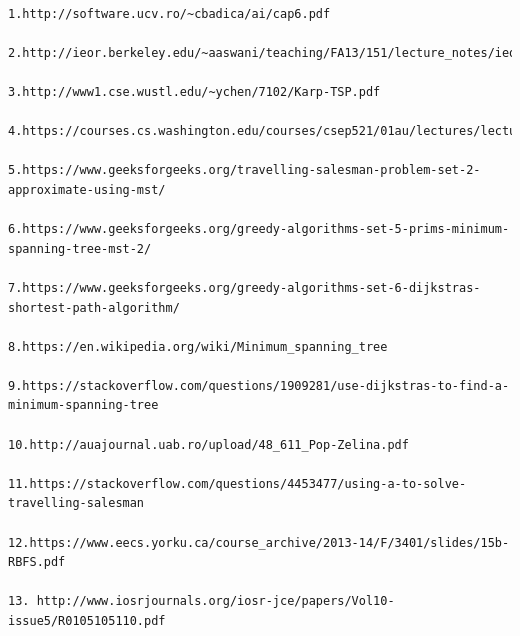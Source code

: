 \documentclass[12pt, a4paper]{article}
\begin{document}
\vspace{20mm}
\scriptsize
\begin{lstlisting}

1.http://software.ucv.ro/~cbadica/ai/cap6.pdf

2.http://ieor.berkeley.edu/~aaswani/teaching/FA13/151/lecture_notes/ieor151_lec17.pdf

3.http://www1.cse.wustl.edu/~ychen/7102/Karp-TSP.pdf

4.https://courses.cs.washington.edu/courses/csep521/01au/lectures/lecture2slides.pdf

5.https://www.geeksforgeeks.org/travelling-salesman-problem-set-2-approximate-using-mst/

6.https://www.geeksforgeeks.org/greedy-algorithms-set-5-prims-minimum-spanning-tree-mst-2/

7.https://www.geeksforgeeks.org/greedy-algorithms-set-6-dijkstras-shortest-path-algorithm/

8.https://en.wikipedia.org/wiki/Minimum_spanning_tree

9.https://stackoverflow.com/questions/1909281/use-dijkstras-to-find-a-minimum-spanning-tree

10.http://auajournal.uab.ro/upload/48_611_Pop-Zelina.pdf

11.https://stackoverflow.com/questions/4453477/using-a-to-solve-travelling-salesman

12.https://www.eecs.yorku.ca/course_archive/2013-14/F/3401/slides/15b-RBFS.pdf

13. http://www.iosrjournals.org/iosr-jce/papers/Vol10-issue5/R0105105110.pdf

\end{lstlisting}
\end{document}
